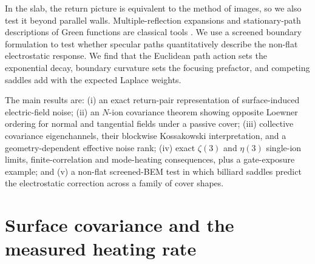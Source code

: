 \documentclass[aps,pra,twocolumn,superscriptaddress,longbibliography,nofootinbib,floatfix]{revtex4-2}
\theoremstyle{remark}
\begin{document}
In the slab, the return picture is equivalent to the method of images, so we also test it beyond parallel walls.  Multiple-reflection expansions and stationary-path descriptions of Green functions are classical tools \cite{BalianBloch1970,BalianBloch1972,BalianDuplantier1977,Bordag2001,Zelditch2004}.  We use a screened boundary formulation to test whether specular paths quantitatively describe the non-flat electrostatic response.  We find that the Euclidean path action sets the exponential decay, boundary curvature sets the focusing prefactor, and competing saddles add with the expected Laplace weights.

The main results are: (i) an exact return-pair representation of surface-induced electric-field noise; (ii) an $N$-ion covariance theorem showing opposite Loewner ordering for normal and tangential fields under a passive cover; (iii) collective covariance eigenchannels, their blockwise Kossakowski interpretation, and a geometry-dependent effective noise rank; (iv) exact $\zeta(3)$ and $\eta(3)$ single-ion limits, finite-correlation and mode-heating consequences, plus a gate-exposure example; and (v) a non-flat screened-BEM test in which billiard saddles predict the electrostatic correction across a family of cover shapes.

\section{Surface covariance and the measured heating rate}
\label{sec:source}
\end{document}

